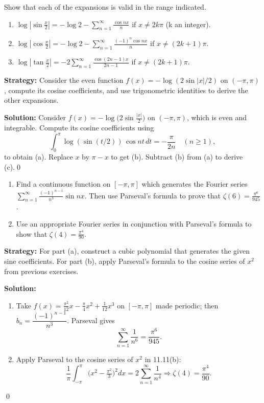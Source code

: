 \begin{problembox}
Show that each of the expansions is valid in the range indicated.
\begin{enumerate}[label=(\alph*)]
\item $\log \left| \sin \frac{x}{2} \right| = -\log 2 - \sum_{n=1}^\infty \frac{\cos nx}{n}$ if $x \neq 2k\pi$ (k an integer).
\item $\log \left| \cos \frac{x}{2} \right| = -\log 2 - \sum_{n=1}^\infty \frac{(-1)^n \cos nx}{n}$ if $x \neq (2k + 1)\pi$.
\item $\log \left| \tan \frac{x}{2} \right| = -2 \sum_{n=1}^\infty \frac{\cos (2n - 1)x}{2n - 1}$ if $x \neq (2k + 1)\pi$.
\end{enumerate}
\end{problembox}

\noindent\textbf{Strategy:} Consider the even function $f(x)=-\log(2\sin|x|/2)$ on $(-\pi,\pi)$, compute its cosine coefficients, and use trigonometric identities to derive the other expansions.

\bigskip\noindent\textbf{Solution:}
Consider $f(x)= -\log\big(2\sin\tfrac{|x|}{2}\big)$ on $(-\pi,\pi)$, which is even and integrable. Compute its cosine coefficients using
\[\int_0^{\pi} \log(\sin(t/2))\,\cos nt\,dt = -\frac{\pi}{2n}\quad (n\ge1),\]
to obtain (a). Replace $x$ by $\pi-x$ to get (b). Subtract (b) from (a) to derive (c).\qed


\begin{problembox}
\begin{enumerate}[label=(\alph*)]
\item Find a continuous function on $[-\pi, \pi]$ which generates the Fourier series $\sum_{n=1}^\infty \frac{(-1)^{n-1}}{n^3} \sin nx$. Then use Parseval's formula to prove that $\zeta(6) = \frac{\pi^6}{945}$.
\item Use an appropriate Fourier series in conjunction with Parseval's formula to show that $\zeta(4) = \frac{\pi^4}{90}$.
\end{enumerate}
\end{problembox}

\noindent\textbf{Strategy:} For part (a), construct a cubic polynomial that generates the given sine coefficients. For part (b), apply Parseval's formula to the cosine series of $x^2$ from previous exercises.

\bigskip\noindent\textbf{Solution:}
\begin{enumerate}[label=(\alph*)]
\item Take $f(x)=\tfrac{\pi^2}{12}x-\tfrac{\pi}{4}x^2+\tfrac{1}{12}x^3$ on $[-\pi,\pi]$ made periodic; then $b_n=\dfrac{(-1)^{n-1}}{n^3}$. Parseval gives
\[\sum_{n=1}^{\infty}\frac{1}{n^6}=\frac{\pi^6}{945}.\]
\item Apply Parseval to the cosine series of $x^2$ in 11.11(b):
\[\frac{1}{\pi}\int_{-\pi}^{\pi}\big(x^2-\tfrac{\pi^2}{3}\big)^2 dx = 2\sum_{n=1}^{\infty}\frac{1}{n^4}\Rightarrow \zeta(4)=\frac{\pi^4}{90}.\]
\end{enumerate}\qed


